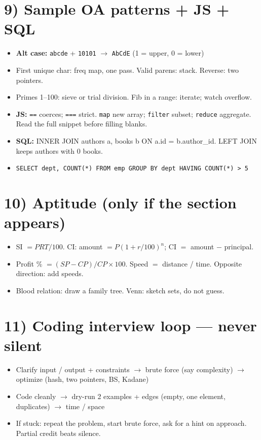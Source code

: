 \documentclass[a4paper,9pt]{extarticle}
\begin{document}
\section{9) Sample OA patterns + JS + SQL}
\begin{itemize}
  \item \textbf{Alt case:} \texttt{abcde} + \texttt{10101} $\to$ \texttt{AbCdE} (1 = upper, 0 = lower)
  \item First unique char: freq map, one pass. Valid parens: stack. Reverse: two pointers.
  \item Primes 1--100: sieve or trial division. Fib in a range: iterate; watch overflow.
  \item \textbf{JS:} \texttt{==} coerces; \texttt{===} strict. \texttt{map} new array; \texttt{filter} subset; \texttt{reduce} aggregate. Read the full snippet before filling blanks.
  \item \textbf{SQL:} INNER JOIN authors a, books b ON a.id = b.author\_id. LEFT JOIN keeps authors with 0 books.
  \item \texttt{SELECT dept, COUNT(*) FROM emp GROUP BY dept HAVING COUNT(*) > 5}
\end{itemize}

\section{10) Aptitude (only if the section appears)}
\begin{itemize}
  \item SI $= PRT/100$. CI: amount $= P(1+r/100)^n$; CI $=$ amount $-$ principal.
  \item Profit \% $= (SP-CP)/CP \times 100$. Speed $=$ distance / time. Opposite direction: add speeds.
  \item Blood relation: draw a family tree. Venn: sketch sets, do not guess.
\end{itemize}

\newpage
{}
\titlespacing{\section}{0pt}{8pt}{2.5pt}
\section{11) Coding interview loop --- never silent}
\begin{itemize}
  \item Clarify input / output + constraints $\to$ brute force (say complexity) $\to$ optimize (hash, two pointers, BS, Kadane)
  \item Code cleanly $\to$ dry-run 2 examples + edges (empty, one element, duplicates) $\to$ time / space
  \item If stuck: repeat the problem, start brute force, ask for a hint on approach. Partial credit beats silence.
\end{itemize}
\end{document}
